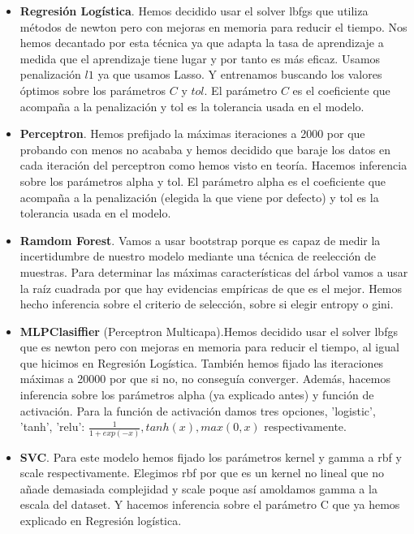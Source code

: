 \documentclass[11pt]{article}
\begin{document}
\begin{itemize}

\item \textbf{Regresión Logística}. Hemos decidido usar el solver lbfgs que
utiliza métodos de newton pero con mejoras en memoria para reducir el tiempo.
Nos hemos decantado por esta técnica ya que adapta la tasa de aprendizaje a
medida que el aprendizaje tiene lugar y por tanto es más eficaz. Usamos
penalización $l1$ ya que usamos Lasso. Y entrenamos buscando los valores óptimos
sobre los parámetros $C$ y $tol$. El parámetro $C$ es el coeficiente que
acompaña a la penalización y tol es la tolerancia usada en el modelo.

\item \textbf{Perceptron}. Hemos prefijado la máximas iteraciones a 2000 por que
probando con menos no acababa y hemos decidido que baraje los datos en cada
iteración del perceptron como hemos visto en teoría. Hacemos inferencia sobre
los parámetros alpha y tol. El parámetro alpha es el coeficiente que acompaña a
la penalización (elegida la que viene por defecto) y tol es la tolerancia usada
en el modelo.

\item \textbf{Ramdom Forest}. Vamos a usar bootstrap porque es capaz de medir la
incertidumbre de nuestro modelo mediante una técnica de reelección de muestras.
Para determinar las máximas características del árbol vamos a usar la raíz
cuadrada por que hay evidencias empíricas de que es el mejor. Hemos hecho
inferencia sobre el criterio de selección, sobre si elegir entropy o gini. 

\item \textbf{MLPClasiffier} (Perceptron Multicapa).Hemos decidido usar el
solver lbfgs que es newton pero con mejoras en memoria para reducir el tiempo,
al igual que hicimos en Regresión Logística. También hemos fijado las
iteraciones máximas a 20000 por que si no, no conseguía converger. Además,
hacemos inferencia sobre los parámetros alpha (ya explicado antes) y función de
activación. Para la función de activación damos tres opciones, 'logistic',
'tanh', 'relu': $ \frac{1}{1 + exp(-x)} , tanh(x), max(0, x)$ respectivamente.

\item \textbf{SVC}. Para este modelo hemos fijado los parámetros kernel y gamma
a rbf y scale respectivamente. Elegimos rbf por que es un kernel no lineal que
no añade demasiada complejidad y scale poque así amoldamos gamma a la escala del
dataset. Y hacemos inferencia sobre el parámetro C que ya hemos explicado en
Regresión logística.

\end{itemize}
\end{document}
